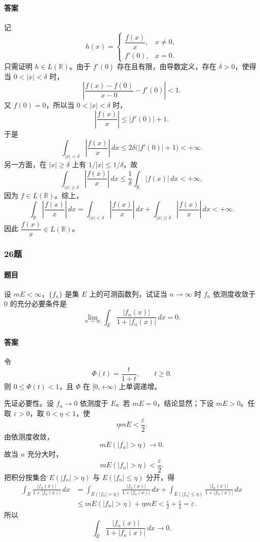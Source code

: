 \documentclass{article}
\begin{document}
	\paragraph{答案} 记
	\[
	h(x)=\begin{cases}
		\dfrac{f(x)}{x},&x\ne0,\\[4pt]
		f'(0),&x=0.
	\end{cases}
	\]
	只需证明 $h\in L(\mathbb{R})$。由于 $f'(0)$ 存在且有限，由导数定义，存在 $\delta>0$，使得当 $0<|x|<\delta$ 时，
	\[
	\left|\frac{f(x)-f(0)}{x-0}-f'(0)\right|<1.
	\]
	又 $f(0)=0$，所以当 $0<|x|<\delta$ 时，
	\[
	\left|\frac{f(x)}{x}\right|\le |f'(0)|+1.
	\]
	于是
	\[
	\int_{|x|<\delta}\left|\frac{f(x)}{x}\right|\,dx
	\le 2\delta\bigl(|f'(0)|+1\bigr)<+\infty.
	\]
	另一方面，在 $|x|\ge\delta$ 上有 $1/|x|\le1/\delta$，故
	\[
	\int_{|x|\ge\delta}\left|\frac{f(x)}{x}\right|\,dx
	\le \frac1\delta\int_{\mathbb{R}}|f(x)|\,dx<+\infty,
	\]
	因为 $f\in L(\mathbb{R})$。综上，
	\[
	\int_{\mathbb{R}}\left|\frac{f(x)}{x}\right|\,dx
	=\int_{|x|<\delta}\left|\frac{f(x)}{x}\right|\,dx
	+\int_{|x|\ge\delta}\left|\frac{f(x)}{x}\right|\,dx<+\infty.
	\]
	因此 $\dfrac{f(x)}{x}\in L(\mathbb{R})$。
	
	
	\subsubsection*{26题}
	\paragraph{题目} 设 $mE<\infty$，$\{f_n\}$ 是集 $E$ 上的可测函数列，试证当 $n\to\infty$ 时 $f_n$ 依测度收敛于 $0$ 的充分必要条件是
	\[
	\lim_{n\to\infty}\int_E\frac{|f_n(x)|}{1+|f_n(x)|}\,dx=0.
	\]
	
	\paragraph{答案} 令
	\[
	\Phi(t)=\frac{t}{1+t},\qquad t\ge0.
	\]
	则 $0\le\Phi(t)<1$，且 $\Phi$ 在 $[0,+\infty)$ 上单调递增。
	
	先证必要性。设 $f_n\to0$ 依测度于 $E$。若 $mE=0$，结论显然；下设 $mE>0$。任取 $\varepsilon>0$，取 $0<\eta<1$，使
	\[
	\eta mE<\frac{\varepsilon}{2}.
	\]
	由依测度收敛，
	\[
	mE(|f_n|>\eta)\to0.
	\]
	故当 $n$ 充分大时，
	\[
	mE(|f_n|>\eta)<\frac{\varepsilon}{2}.
	\]
	把积分按集合 $E(|f_n|>\eta)$ 与 $E(|f_n|\le\eta)$ 分开，得
	\[
	\begin{aligned}
		\int_E\frac{|f_n(x)|}{1+|f_n(x)|}\,dx
		&=\int_{E(|f_n|>\eta)}\frac{|f_n(x)|}{1+|f_n(x)|}\,dx
		+\int_{E(|f_n|\le\eta)}\frac{|f_n(x)|}{1+|f_n(x)|}\,dx \\
		&\le mE(|f_n|>\eta)+\eta mE
		<\frac{\varepsilon}{2}+\frac{\varepsilon}{2}=\varepsilon.
	\end{aligned}
	\]
	所以
	\[
	\int_E\frac{|f_n(x)|}{1+|f_n(x)|}\,dx\to0.
	\]
	
\end{document}
